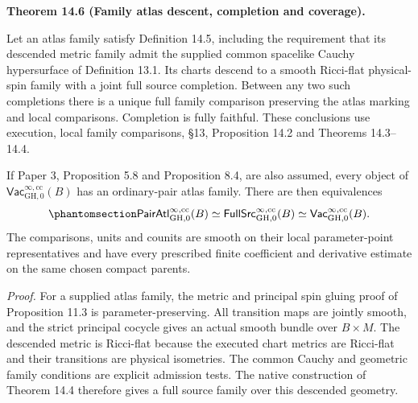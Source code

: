 \documentclass[
  english,
  11pt,
  reqno]{amsart}
\makeatletter
\newcommand{\pandocstatementheading}[1]{%
  \par\addpenalty{\@beginparpenalty}%
  \addvspace{.5\baselineskip plus .2\baselineskip minus .2\baselineskip}%
  {\normalfont\bfseries #1\par}%
  \nobreak\@afterindenttrue\@afterheading
}
\makeatother
\begin{document}
\pandocstatementheading{\protect{}\label{thm:family-atlas-completion-correspondence}Theorem 14.6 (Family atlas descent, completion and coverage).}

Let an atlas family satisfy Definition 14.5, including the requirement
that its descended metric family admit the supplied common spacelike
Cauchy hypersurface of Definition 13.1. Its charts descend to a smooth
Ricci-flat physical-spin family with a joint full source completion.
Between any two such completions there is a unique full family
comparison preserving the atlas marking and local comparisons.
Completion is fully faithful. These conclusions use execution, local
family comparisons, §13, Proposition 14.2 and Theorems 14.3--14.4.

If Paper 3, Proposition 5.8 and Proposition 8.4, are also assumed, every
object of \(\mathsf{Vac}^{\infty,\mathrm{cc}}_{\mathrm{GH},0}(B)\) has
an ordinary-pair atlas family. There are then equivalences
\begin{equation}\protect\phantomsection\label{eq:family-three-correspondences}{
\mathsf{PairAtl}^{\infty,\mathrm{cc}}_{\mathrm{GH},0}(B)
\simeq
\mathsf{FullSrc}^{\infty,\mathrm{cc}}_{\mathrm{GH},0}(B)
\simeq
\mathsf{Vac}^{\infty,\mathrm{cc}}_{\mathrm{GH},0}(B).
}\end{equation} The comparisons, units and counits are smooth on their
local parameter-point representatives and have every prescribed finite
coefficient and derivative estimate on the same chosen compact parents.

\emph{Proof.} For a supplied atlas family, the metric and principal spin
gluing proof of Proposition 11.3 is parameter-preserving. All transition
maps are jointly smooth, and the strict principal cocycle gives an
actual smooth bundle over \(B\times M\). The descended metric is
Ricci-flat because the executed chart metrics are Ricci-flat and their
transitions are physical isometries. The common Cauchy and geometric
family conditions are explicit admission tests. The native construction
of Theorem 14.4 therefore gives a full source family over this descended
geometry.
\end{document}
